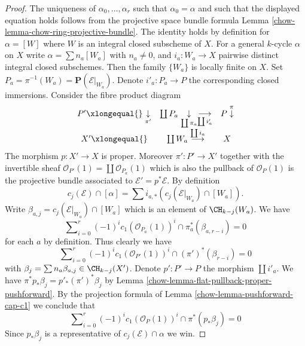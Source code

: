 \begin{proof}

The uniqueness of $\alpha_0, \ldots, \alpha_r$ such that
$\alpha_0 = \alpha$ and such that
the displayed equation holds follows from
the projective space bundle formula
Lemma \ref{chow-lemma-chow-ring-projective-bundle}.
The identity holds by definition for $\alpha = [W]$ where $W$
is an integral closed subscheme of $X$.
For a general $k$-cycle $\alpha$ on $X$ write
$\alpha = \sum n_a[W_a]$ with $n_a \not = 0$, and
$i_a : W_a \to X$ pairwise distinct integral closed subschemes.
Then the family $\{W_a\}$ is locally finite on $X$.
Set $P_a = \pi^{-1}(W_a) = \mathbf{P}(\mathcal{E}|_{W_a})$.
Denote $i'_a : P_a \to P$ the corresponding closed immersions.
Consider the fibre product diagram
$$
\begin{array}{ccc}P' \xlongequal{}\underset{\pi'}{\downarrow} & \coprod P_a \underset{\coprod \pi_a}{\downarrow}\underset{\coprod i'_a}{\longrightarrow} & P \overset{\pi}{\downarrow} \\ X' \xlongequal{} & \coprod W_a \overset{\coprod i_a}{\longrightarrow} & X\end{array}
$$
The morphism $p : X' \to X$ is proper. Moreover
$\pi' : P' \to X'$ together with the invertible sheaf
$\mathcal{O}_{P'}(1) = \coprod \mathcal{O}_{P_a}(1)$
which is also the pullback of $\mathcal{O}_P(1)$
is the projective bundle associated to
$\mathcal{E}' = p^*\mathcal{E}$. By definition
$$
c_j(\mathcal{E}) \cap [\alpha]
=
\sum i_{a, *}(c_j(\mathcal{E}|_{W_a}) \cap [W_a]).
$$
Write $\beta_{a, j} = c_j(\mathcal{E}|_{W_a}) \cap [W_a]$
which is an element of $\CH_{k - j}(W_a)$. We have
$$
\sum\nolimits_{i = 0}^r
(-1)^i c_1(\mathcal{O}_{P_a}(1))^i \cap \pi_a^*(\beta_{a, r - i}) = 0
$$
for each $a$ by definition. Thus clearly we have
$$
\sum\nolimits_{i = 0}^r
(-1)^i c_1(\mathcal{O}_{P'}(1))^i \cap (\pi')^*(\beta_{r - i}) = 0
$$
with $\beta_j = \sum n_a\beta_{a, j} \in \CH_{k - j}(X')$. Denote
$p' : P' \to P$ the morphism $\coprod i'_a$.
We have $\pi^*p_*\beta_j = p'_*(\pi')^*\beta_j$
by Lemma \ref{chow-lemma-flat-pullback-proper-pushforward}.
By the projection formula of Lemma \ref{chow-lemma-pushforward-cap-c1}
we conclude that
$$
\sum\nolimits_{i = 0}^r
(-1)^i c_1(\mathcal{O}_P(1))^i \cap \pi^*(p_*\beta_j) = 0
$$
Since $p_*\beta_j$ is a representative of $c_j(\mathcal{E}) \cap \alpha$
we win.
\end{proof}

